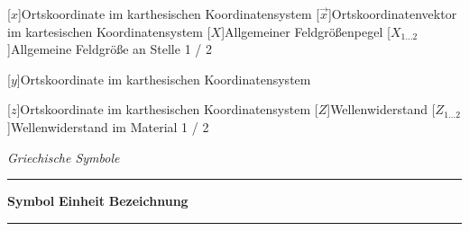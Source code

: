 \begin{acronym}[Platzhalterwort]
[$x$]{\acrounit{-}Ortskoordinate im karthesischen Koordinatensystem}
[$\vec x$]{\acrounit{-}Ortskoordinatenvektor im kartesischen Koordinatensystem}
[$X$]{\acrounit{\Dezibel}Allgemeiner Feldgrößenpegel}
[$X_{1\ldots2}$]{\acrounit{-}Allgemeine Feldgröße an Stelle 1 / 2}

[$y$]{\acrounit{-}Ortskoordinate im karthesischen Koordinatensystem}

[$z$]{\acrounit{-}Ortskoordinate im karthesischen Koordinatensystem}
[$Z$]{\acrounit{-}Wellenwiderstand}
[$Z_{1\ldots2}$]{\acrounit{-}Wellenwiderstand im Material 1 / 2}

\end{acronym}
\newpage



\textit{Griechische Symbole} \\[.5\linespace]
\noindent\rule{\textwidth}{0.5pt}
\textbf{Symbol} \hspace{12.5mm} \textbf{Einheit} \hspace{10.5mm} \textbf{Bezeichnung} \\[-\linespace]
\noindent\rule{\textwidth}{0.5pt}


